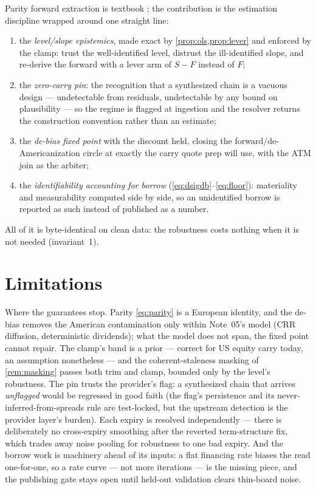 \documentclass[11pt]{article}
\begin{document}
Parity forward extraction is textbook \cite{Hull2017}; the contribution
is the estimation discipline wrapped around one straight line:
\begin{enumerate}[leftmargin=1.6em]
\item the \emph{level/slope epistemics}, made exact by
\cref{prop:ols,prop:lever} and enforced by the clamp: trust the
well-identified level, distrust the ill-identified slope, and re-derive
the forward with a lever arm of $S-F$ instead of $F$;
\item the \emph{zero-carry pin}: the recognition that a synthesized chain
is a vacuous design --- undetectable from residuals, undetectable by any
bound on plausibility --- so the regime is flagged at ingestion and the
resolver returns the construction convention rather than an estimate;
\item the \emph{de-bias fixed point} with the discount held, closing the
forward/de-Americanization circle at exactly the carry quote prep will
use, with the ATM join as the arbiter;
\item the \emph{identifiability accounting for borrow}
(\ref{eq:dsigdb}--\ref{eq:floor}): materiality and measurability computed
side by side, so an unidentified borrow is reported as such instead of
published as a number.
\end{enumerate}
All of it is byte-identical on clean data: the robustness costs nothing
when it is not needed (invariant~1).

\section{Limitations}
\label{sec:limits}

Where the guarantees stop.  Parity \eqref{eq:parity} is a European
identity, and the de-bias removes the American contamination only within
Note~05's model (CRR diffusion, deterministic dividends); what the model
does not span, the fixed point cannot repair.  The clamp's band is a
prior --- correct for US equity carry today, an assumption nonetheless
--- and the coherent-staleness masking of \cref{rem:masking} passes both
trim and clamp, bounded only by the level's robustness.  The pin trusts
the provider's flag: a synthesized chain that arrives \emph{unflagged}
would be regressed in good faith (the flag's persistence and its
never-inferred-from-spreads rule are test-locked, but the upstream
detection is the provider layer's burden).  Each expiry is resolved
independently --- there is deliberately no cross-expiry smoothing after
the reverted term-structure fix, which trades away noise pooling for
robustness to one bad expiry.  And the borrow work is machinery ahead of
its inputs: a flat financing rate biases the read one-for-one, so a rate
curve --- not more iterations --- is the missing piece, and the
publishing gate stays open until held-out validation clears thin-board
noise.
\end{document}
